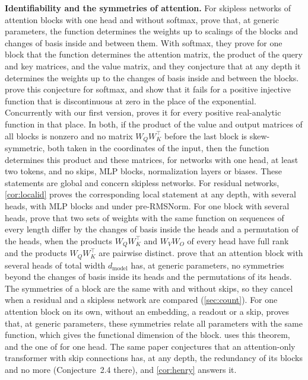 \documentclass[10pt]{article}
\theoremstyle{definition}
\theoremstyle{remark}
\newcommand{\dm}{d_{\mathrm{model}}}
\newcommand{\para}[1]{\smallskip\noindent\textbf{#1}\hspace{0.5em}}
\begin{document}
\para{Identifiability and the symmetries of attention.} For skipless networks of attention blocks with one head and without softmax, \citet{henry2025lightning} prove that, at generic parameters, the function determines the weights up to scalings of the blocks and changes of basis inside and between them. With softmax, they prove for one block that the function determines the attention matrix, the product of the query and key matrices, and the value matrix, and they conjecture that at any depth it determines the weights up to the changes of basis inside and between the blocks. \citet{amarel2026identifiability} prove this conjecture for softmax, and show that it fails for a positive injective function that is discontinuous at zero in the place of the exponential. Concurrently with our first version, \citet{konda2026identifiability} proves it for every positive real-analytic function in that place. In both, if the product of the value and output matrices of all blocks is nonzero and no matrix $W_QW_K^\top$ before the last block is skew-symmetric, both taken in the coordinates of the input, then the function determines this product and these matrices, for networks with one head, at least two tokens, and no skips, MLP blocks, normalization layers or biases. These statements are global and concern skipless networks. For residual networks, \cref{cor:localid} proves the corresponding local statement at any depth, with several heads, with MLP blocks and under pre-RMSNorm. For one block with several heads, \citet[Theorem~3.2]{tran2025equivariant} prove that two sets of weights with the same function on sequences of every length differ by the changes of basis inside the heads and a permutation of the heads, when the products $W_QW_K^\top$ and $W_VW_O$ of every head have full rank and the products $W_QW_K^\top$ are pairwise distinct. \citet{wang2025gauge} prove that an attention block with several heads of total width $\dm$ has, at generic parameters, no symmetries beyond the changes of basis inside its heads and the permutations of its heads. The symmetries of a block are the same with and without skips, so they cancel when a residual and a skipless network are compared (\cref{sec:count}). For one attention block on its own, without an embedding, a readout or a skip, \citet[Theorem~2.1]{henry2026generic} proves that, at generic parameters, these symmetries relate all parameters with the same function, which gives the functional dimension of the block.  uses this theorem, and the one of \citet{henry2025lightning} for one head. The same paper conjectures that an attention-only transformer with skip connections has, at any depth, the redundancy of its blocks and no more (Conjecture~2.4 there), and \cref{cor:henry} answers it.
\end{document}
